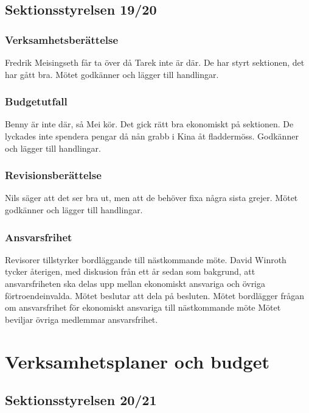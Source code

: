 \documentclass{sektionsmote}
\begin{document}
\subsection{Sektionsstyrelsen 19/20}

\subsubsection{Verksamhetsberättelse}
Fredrik Meisingseth får ta över då Tarek inte är där.
De har styrt sektionen, det har gått bra.
Mötet godkänner och lägger till handlingar.

\subsubsection{Budgetutfall}
Benny är inte där, så Mei kör.
Det gick rätt bra ekonomiskt på sektionen.
De lyckades inte spendera pengar då nån grabb i Kina åt fladdermöss.
Godkänner och lägger till handlingar.

\subsubsection{Revisionsberättelse}
Nils säger att det ser bra ut, men att de behöver fixa några sista grejer.
Mötet godkänner och lägger till handlingar.

\subsubsection{Ansvarsfrihet}
Revisorer tillstyrker bordläggande till nästkommande möte.
David Winroth tycker återigen, med diskusion från ett år sedan som bakgrund, att ansvarsfriheten ska delas upp mellan ekonomiskt ansvariga och övriga förtroendeinvalda.
Mötet beslutar att dela på besluten.
Mötet bordlägger frågan om ansvarsfrihet för ekonomiskt ansvariga till nästkommande möte
Mötet beviljar övriga medlemmar ansvarsfrihet.


\section{Verksamhetsplaner och budget}

\subsection{Sektionsstyrelsen 20/21}
\end{document}
